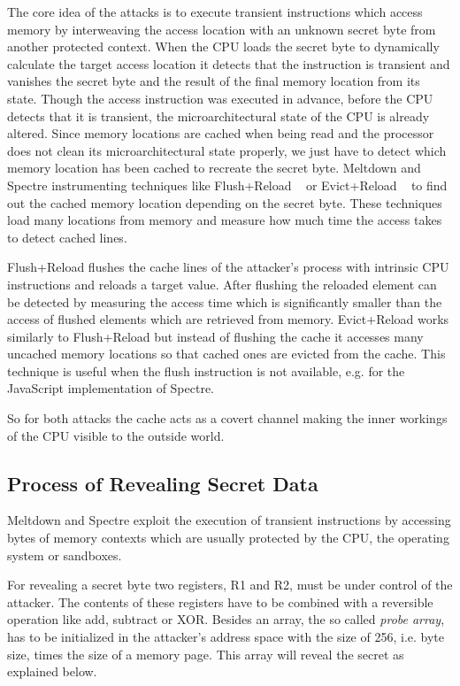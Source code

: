 \documentclass[a4paper,oneside,openright] {scrreprt}
\begin{document}
The core idea of the attacks is to execute transient instructions 
which access memory by interweaving the access location with an unknown secret byte from another protected context. 
When the CPU loads the secret byte to dynamically calculate the target access location 
it detects that the instruction is transient and vanishes the secret byte and the result of the final memory location from its state. 
Though the access instruction was executed in advance, before the CPU detects that it is transient, the microarchitectural state
 of the CPU is already altered.
 Since memory locations are cached when being read and the processor does not clean its microarchitectural state properly,
 we just have to detect which memory location has been cached to recreate the secret byte.
 Meltdown and Spectre instrumenting techniques like Flush+Reload ~\cite{yarom2014flush} 
 or Evict+Reload ~\cite{gruss2015cache} to find out the cached memory location depending on the secret byte.
These techniques load many locations from memory and measure how much time the access takes to detect cached lines.

Flush+Reload flushes the cache lines of the attacker's process with intrinsic CPU instructions and reloads a target value.
After flushing the reloaded element can be detected by measuring the access time which is significantly smaller than the access
of flushed elements which are retrieved from memory.
Evict+Reload works similarly to Flush+Reload but instead of flushing the cache it accesses many uncached memory
locations so that cached ones are evicted from the cache.
This technique is useful when the flush instruction is not available, e.g. for the JavaScript implementation of Spectre. 

 So for both attacks the cache acts as a covert channel making the inner workings of the CPU visible to the outside world.

\subsection{Process of Revealing Secret Data}
\label{ch:intro:motivation:A}

Meltdown and Spectre exploit the execution of transient instructions by accessing bytes of memory contexts 
 which are usually protected by the CPU, the operating system or sandboxes. 

For revealing a secret byte two registers, R1 and R2, must be under control of the attacker. The contents of these registers have to be 
combined with a reversible operation like add, subtract or XOR. Besides an array, the so called \textit{probe array}, has to be 
initialized in the attacker's address space with the size of 256, i.e. byte size, times the size of a memory page. This array will 
reveal the secret as explained below.
\end{document}
